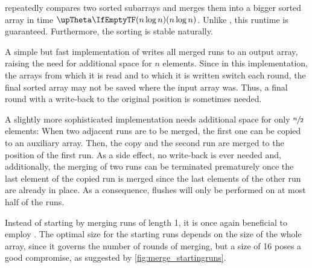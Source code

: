 \MS{} repeatedly compares two sorted subarrays and merges them into a bigger sorted array in time \(\bigtheta{n \log n}\).
Unlike \QS{}, this runtime is guaranteed.
Furthermore, the sorting is stable naturally.

A simple but fast implementation of \MS{} writes all merged runs to an output array, raising the need for additional space for \(n\) elements.
Since in this implementation, the arrays from which it is read and to which it is written switch each round, the final sorted array may not be saved where the input array was.
Thus, a final round with a write-back to the original position is sometimes needed.

A slightly more sophisticated implementation needs additional space for only \(\sfrac{n}{2}\) elements:
When two adjacent runs are to be merged, the first one can be copied to an auxiliary array.
Then, the copy and the second run are merged to the position of the first run.
As a side effect, no write-back is ever needed and, additionally, the merging of two runs can be terminated prematurely once the last element of the copied run is merged since the last elements of the other run are already in place.
As a consequence, flushes will only be performed on at most half of the runs.

Instead of starting by merging runs of length 1, it is once again beneficial to employ \IS{}.
The optimal size for the starting runs depends on the size of the whole array, since it governs the number of rounds of merging, but a size of 16 poses a good compromise, as suggested by \cref{fig:merge_startingruns}.

